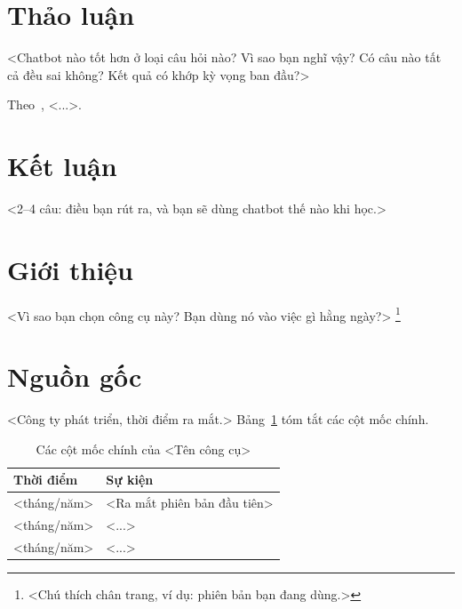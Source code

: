 \documentclass[12pt,a4paper]{article}
\begin{document}
\section{Thảo luận}
<Chatbot nào tốt hơn ở loại câu hỏi nào? Vì sao bạn nghĩ vậy?
Có câu nào tất cả đều sai không? Kết quả có khớp kỳ vọng ban đầu?>

Theo~\cite{vaswani2017}, <...>.   %

\section{Kết luận}
<2--4 câu: điều bạn rút ra, và bạn sẽ dùng chatbot thế nào khi học.>

\else

\section{Giới thiệu}
<Vì sao bạn chọn công cụ này? Bạn dùng nó vào việc gì hằng ngày?>%
\footnote{<Chú thích chân trang, ví dụ: phiên bản bạn đang dùng.>}

\section{Nguồn gốc}
<Công ty phát triển, thời điểm ra mắt.> Bảng~\ref{tab:mocs} tóm tắt
các cột mốc chính.   %

\begin{table}[H]
  \centering
  \caption{Các cột mốc chính của <Tên công cụ>}
  \label{tab:mocs}
  \begin{tabular}{lp{10cm}}
    \toprule
    Thời điểm & Sự kiện \\
    \midrule
    <tháng/năm> & <Ra mắt phiên bản đầu tiên> \\
    <tháng/năm> & <...> \\
    <tháng/năm> & <...> \\
    \bottomrule
  \end{tabular}
\end{table}
\end{document}
